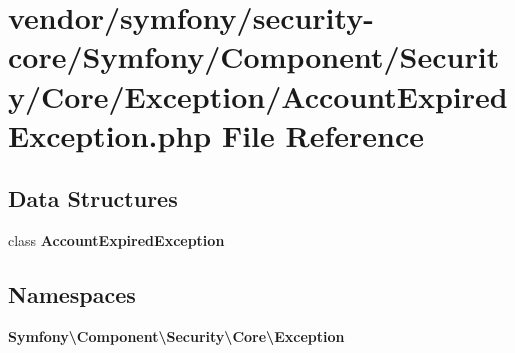 \section{vendor/symfony/security-\/core/\+Symfony/\+Component/\+Security/\+Core/\+Exception/\+Account\+Expired\+Exception.php File Reference}
\label{_account_expired_exception_8php}
\subsection*{Data Structures}
\begin{DoxyCompactItemize}
\item 
class {\bf Account\+Expired\+Exception}
\end{DoxyCompactItemize}
\subsection*{Namespaces}
\begin{DoxyCompactItemize}
\item 
 {\bf Symfony\textbackslash{}\+Component\textbackslash{}\+Security\textbackslash{}\+Core\textbackslash{}\+Exception}
\end{DoxyCompactItemize}
